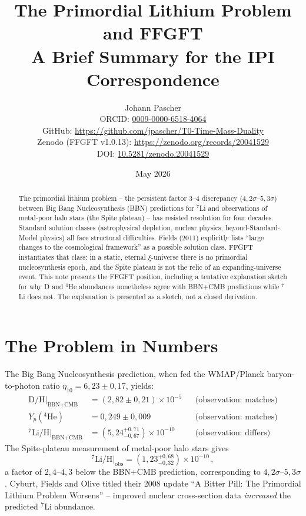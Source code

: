 \documentclass[11pt,a4paper]{article}
\title{The Primordial Lithium Problem and FFGFT\\[2pt]
  \large A Brief Summary for the IPI Correspondence}
\author{Johann Pascher\\[2pt]
\small ORCID: \href{https://orcid.org/0009-0000-6518-4064}{0009-0000-6518-4064}\\
\small GitHub: \url{https://github.com/jpascher/T0-Time-Mass-Duality}\\
\small Zenodo (FFGFT v1.0.13): \url{https://zenodo.org/records/20041529}\\
\small DOI: \href{https://doi.org/10.5281/zenodo.20041529}{10.5281/zenodo.20041529}}
\date{May 2026}
\begin{document}
\maketitle

\begin{abstract}
\noindent The primordial lithium problem -- the persistent factor 3--4 discrepancy ($4{,}2\sigma$--$5{,}3\sigma$) between Big Bang Nucleosynthesis (BBN) predictions for $^7$Li and observations of metal-poor halo stars (the Spite plateau) -- has resisted resolution for four decades. Standard solution classes (astrophysical depletion, nuclear physics, beyond-Standard-Model physics) all face structural difficulties. Fields (2011) explicitly lists ``large changes to the cosmological framework'' as a possible solution class. FFGFT instantiates that class: in a static, eternal $\xi$-universe there is no primordial nucleosynthesis epoch, and the Spite plateau is not the relic of an expanding-universe event. This note presents the FFGFT position, including a tentative explanation sketch for why D and $^4$He abundances nonetheless agree with BBN+CMB predictions while $^7$Li does not. The explanation is presented as a sketch, not a closed derivation.
\end{abstract}

\section{The Problem in Numbers}

The Big Bang Nucleosynthesis prediction, when fed the WMAP/Planck baryon-to-photon ratio $\eta_{10} = 6{,}23 \pm 0{,}17$, yields:
\begin{align}
\text{D/H}\big|_{\text{BBN+CMB}} &= (2{,}82 \pm 0{,}21) \times 10^{-5} &&\text{(observation: matches)}\\
Y_p(^4\text{He}) &= 0{,}249 \pm 0{,}009 &&\text{(observation: matches)}\\
^{7}\text{Li/H}\big|_{\text{BBN+CMB}} &= (5{,}24^{+0{,}71}_{-0{,}67}) \times 10^{-10} &&\text{(observation: differs)}
\end{align}
The Spite-plateau measurement \cite{spitespite1982,fields2011} of metal-poor halo stars gives
\begin{equation}
^{7}\text{Li/H}\big|_{\text{obs}} = (1{,}23^{+0{,}68}_{-0{,}32}) \times 10^{-10}\,,
\end{equation}
a factor of $2{,}4$--$4{,}3$ below the BBN+CMB prediction, corresponding to $4{,}2\sigma$--$5{,}3\sigma$ \cite{cyburt2008}. Cyburt, Fields and Olive titled their 2008 update ``A Bitter Pill: The Primordial Lithium Problem Worsens'' -- improved nuclear cross-section data \emph{increased} the predicted $^7$Li abundance.
\end{document}
